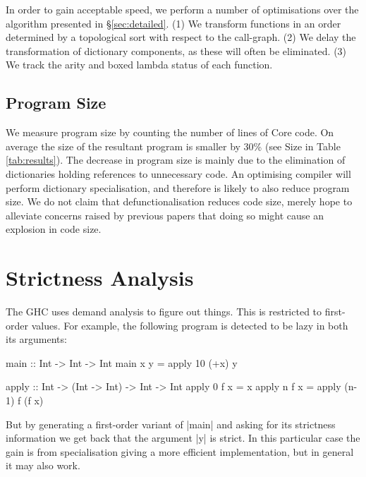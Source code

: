\documentclass[preprint]{sigplanconf}
\begin{document}
In order to gain acceptable speed, we perform a number of optimisations over the algorithm presented in \S\ref{sec:detailed}. (1) We transform functions in an order determined by a topological sort with respect to the call-graph. (2) We delay the transformation of dictionary components, as these will often be eliminated. (3) We track the arity and boxed lambda status of each function.

\subsection{Program Size}



We measure program size by counting the number of lines of Core code. On average the size of the resultant program is smaller by 30\% (see Size in Table \ref{tab:results}). The decrease in program size is mainly due to the elimination of dictionaries holding references to unnecessary code. An optimising compiler will perform dictionary specialisation, and therefore is likely to also reduce program size. We do not claim that defunctionalisation reduces code size, merely hope to alleviate concerns raised by previous papers \cite{chin:higher_order_removal} that doing so might cause an explosion in code size.

\section{Strictness Analysis}


The GHC uses demand analysis to figure out things. This is restricted to first-order values. For example, the following program is detected to be lazy in both its arguments:

\begin{example}
\begin{code}
main :: Int -> Int -> Int
main x y = apply 10 (+x) y

apply :: Int -> (Int -> Int) -> Int -> Int
apply 0 f x = x
apply n f x = apply (n-1) f (f x)
\end{code}

But by generating a first-order variant of |main| and asking for its strictness information we get back that the argument |y| is strict. In this particular case the gain is from specialisation giving a more efficient implementation, but in general it may also work.
\end{example}
\end{document}
